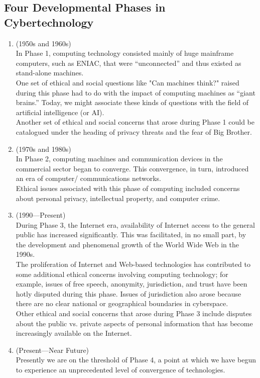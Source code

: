 \documentclass[12pt]{article}
\theoremstyle{definition}
\begin{document}
\subsection{Four Developmental Phases in Cybertechnology}
\begin{enumerate}[label=Phase \arabic*]
\item (1950s and 1960s)\\In Phase 1, computing technology consisted mainly of huge mainframe computers, such as ENIAC, that were “unconnected” and thus existed as stand-alone machines.\\One set of ethical and social questions like "Can machines think?" raised during this phase had to do with the impact of computing machines as “giant brains.” Today, we might associate these kinds of questions with the field of artificial intelligence (or AI).\\Another set of ethical and social concerns that arose during Phase 1 could be catalogued under the heading of privacy threats and the fear of Big Brother.
\item (1970s and 1980s)\\In Phase 2, computing machines and communication devices in the commercial sector began to converge. This convergence, in turn, introduced an era of computer/ communications networks.\\Ethical issues associated with this phase of computing included concerns about personal privacy, intellectual property, and computer crime.
\item (1990---Present)\\During Phase 3, the Internet era, availability of Internet access to the general public has increased significantly. This was facilitated, in no small part, by the development and phenomenal growth of the World Wide Web in the 1990s.\\The proliferation of Internet and Web-based technologies has contributed to some additional ethical concerns involving computing technology; for example, issues of free speech, anonymity, jurisdiction, and trust have been hotly disputed during this phase. Issues of jurisdiction also arose because there are no clear national or geographical boundaries in cyberspace.\\Other ethical and social concerns that arose during Phase 3 include disputes about the public vs. private aspects of personal information that has become increasingly available on the Internet.
\item (Present---Near Future)\\Presently we are on the threshold of Phase 4, a point at which we have begun to experience an unprecedented level of convergence of technologies. 
\end{enumerate}
\end{document}
